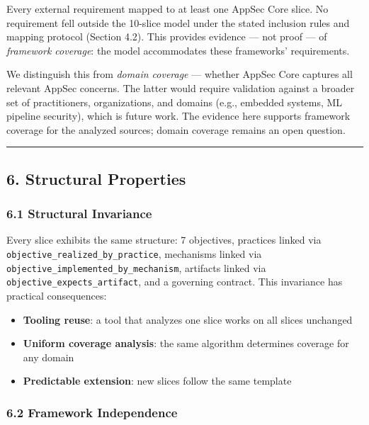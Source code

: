 \documentclass[
]{article}
\providecommand{\tightlist}{%
  \setlength{\itemsep}{0pt}\setlength{\parskip}{0pt}}
\begin{document}
Every external requirement mapped to at least one AppSec Core slice. No
requirement fell outside the 10-slice model under the stated inclusion
rules and mapping protocol (Section 4.2). This provides evidence --- not
proof --- of \emph{framework coverage}: the model accommodates these
frameworks' requirements.

We distinguish this from \emph{domain coverage} --- whether AppSec Core
captures all relevant AppSec concerns. The latter would require
validation against a broader set of practitioners, organizations, and
domains (e.g., embedded systems, ML pipeline security), which is future
work. The evidence here supports framework coverage for the analyzed
sources; domain coverage remains an open question.

\begin{center}\rule{0.5\linewidth}{0.5pt}\end{center}

\subsection{6. Structural Properties}\label{structural-properties}

\subsubsection{6.1 Structural Invariance}\label{structural-invariance}

Every slice exhibits the same structure: 7 objectives, practices linked
via \texttt{objective\_realized\_by\_practice}, mechanisms linked via
\texttt{objective\_implemented\_by\_mechanism}, artifacts linked via
\texttt{objective\_expects\_artifact}, and a governing contract. This
invariance has practical consequences:

\begin{itemize}
\tightlist
\item
  \textbf{Tooling reuse}: a tool that analyzes one slice works on all
  slices unchanged
\item
  \textbf{Uniform coverage analysis}: the same algorithm determines
  coverage for any domain
\item
  \textbf{Predictable extension}: new slices follow the same template
\end{itemize}

\subsubsection{6.2 Framework Independence}\label{framework-independence}
\end{document}
